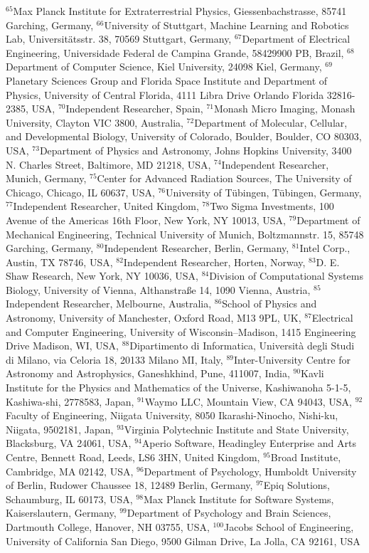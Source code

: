 $^{65}$Max Planck Institute for Extraterrestrial Physics, Giessenbachstrasse, 85741 Garching, Germany, 
$^{66}$University of Stuttgart, Machine Learning and Robotics Lab, Universitätsstr. 38, 70569 Stuttgart, Germany, 
$^{67}$Department of Electrical Engineering, Universidade Federal de Campina Grande, 58429900 PB, Brazil, 
$^{68}$Department of Computer Science, Kiel University, 24098 Kiel, Germany, 
$^{69}$Planetary Sciences Group and Florida Space Institute and Department of Physics, University of Central Florida, 4111 Libra Drive Orlando Florida 32816-2385, USA, 
$^{70}$Independent Researcher, Spain, 
$^{71}$Monash Micro Imaging, Monash University, Clayton VIC 3800, Australia, 
$^{72}$Department of Molecular, Cellular, and Developmental Biology, University of Colorado, Boulder, Boulder, CO 80303, USA, 
$^{73}$Department of Physics and Astronomy, Johns Hopkins University, 3400 N. Charles Street, Baltimore, MD 21218, USA, 
$^{74}$Independent Researcher, Munich, Germany, 
$^{75}$Center for Advanced Radiation Sources, The University of Chicago, Chicago, IL 60637, USA, 
$^{76}$University of T\"ubingen, T\"ubingen, Germany, 
$^{77}$Independent Researcher, United Kingdom, 
$^{78}$Two Sigma Investments, 100 Avenue of the Americas 16th Floor, New York, NY 10013, USA, 
$^{79}$Department of Mechanical Engineering, Technical University of Munich, Boltzmannstr. 15, 85748 Garching, Germany, 
$^{80}$Independent Researcher, Berlin, Germany, 
$^{81}$Intel Corp., Austin, TX 78746, USA, 
$^{82}$Independent Researcher, Horten, Norway, 
$^{83}$D. E. Shaw Research, New York, NY 10036, USA, 
$^{84}$Division of Computational Systems Biology, University of Vienna, Althanstra{\ss}e 14, 1090 Vienna, Austria, 
$^{85}$Independent Researcher, Melbourne, Australia, 
$^{86}$School of Physics and Astronomy, University of Manchester, Oxford Road, M13 9PL, UK, 
$^{87}$Electrical and Computer Engineering, University of Wisconsin--Madison, 1415 Engineering Drive Madison, WI, USA, 
$^{88}$Dipartimento di Informatica, Universit\`a degli Studi di Milano, via Celoria 18, 20133 Milano MI, Italy, 
$^{89}$Inter-University Centre for Astronomy and Astrophysics, Ganeshkhind, Pune, 411007, India, 
$^{90}$Kavli Institute for the Physics and Mathematics of the Universe, Kashiwanoha 5-1-5, Kashiwa-shi, 2778583, Japan, 
$^{91}$Waymo LLC, Mountain View, CA 94043, USA, 
$^{92}$Faculty of Engineering, Niigata University, 8050 Ikarashi-Ninocho, Nishi-ku, Niigata, 9502181, Japan, 
$^{93}$Virginia Polytechnic Institute and State University, Blacksburg, VA 24061, USA, 
$^{94}$Aperio Software, Headingley Enterprise and Arts Centre, Bennett Road, Leeds, LS6 3HN, United Kingdom, 
$^{95}$Broad Institute, Cambridge, MA 02142, USA, 
$^{96}$Department of Psychology, Humboldt University of Berlin, Rudower Chaussee 18, 12489 Berlin, Germany, 
$^{97}$Epiq Solutions, Schaumburg, IL 60173, USA, 
$^{98}$Max Planck Institute for Software Systems, Kaiserslautern, Germany, 
$^{99}$Department of Psychology and Brain Sciences, Dartmouth College, Hanover, NH 03755, USA, 
$^{100}$Jacobs School of Engineering, University of California San Diego, 9500 Gilman Drive, La Jolla, CA 92161, USA